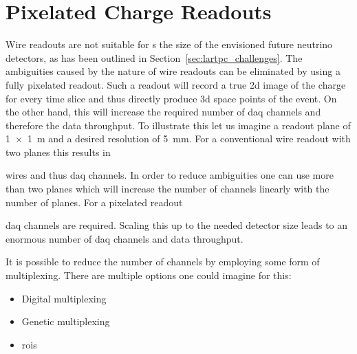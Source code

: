 \section{Pixelated Charge Readouts}
\label{sec:studies_pixel-ro}


Wire readouts are not suitable for \lartpc{}s the size of the envisioned future neutrino detectors, as has been outlined in Section~\ref{sec:lartpc_challenges}.
The ambiguities caused by the nature of wire readouts can be eliminated by using a fully pixelated readout.
Such a readout will record a true \gls{2d} image of the charge for every time slice and thus directly produce \gls{3d} space points of the event.
On the other hand, this will increase the required number of \gls{daq} channels and therefore the data throughput.
To illustrate this let us imagine a readout plane of \SI{1 x 1}{\metre} and a desired resolution of \SI{5}{\milli\metre}.
For a conventional wire readout with two planes this results in


wires and thus \gls{daq} channels.
In order to reduce ambiguities one can use more than two planes which will increase the number of channels linearly with the number of planes.
For a pixelated readout


\gls{daq} channels are required.
Scaling this up to the needed detector size leads to an enormous number of \gls{daq} channels and data throughput.

It is possible to reduce the number of channels by employing some form of multiplexing.
There are multiple options one could imagine for this:
\begin{itemize}
	\item Digital multiplexing
	\item Genetic multiplexing
	\item \glspl{roi}
\end{itemize}

